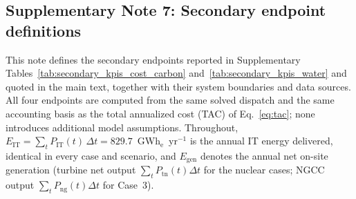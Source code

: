 %
%

\subsection*{Supplementary Note 7: Secondary endpoint definitions}\label{note:endpoints}

This note defines the secondary endpoints reported in Supplementary Tables~\ref{tab:secondary_kpis_cost_carbon} and~\ref{tab:secondary_kpis_water} and quoted in the main text, together with their system boundaries and data sources. All four endpoints are computed from the same solved dispatch and the same accounting basis as the total annualized cost (TAC) of Eq.~\eqref{eq:tac}; none introduces additional model assumptions. Throughout, $E_\mathrm{IT}=\sum_t P_\mathrm{IT}(t)\,\Delta t = 829.7$~GWh$_\mathrm{e}$~yr$^{-1}$ is the annual IT energy delivered, identical in every case and scenario, and $E_\mathrm{gen}$ denotes the annual net on-site generation (turbine net output $\sum_t P_\mathrm{tn}(t)\Delta t$ for the nuclear cases; NGCC output $\sum_t P_\mathrm{ng}(t)\Delta t$ for Case~3).

